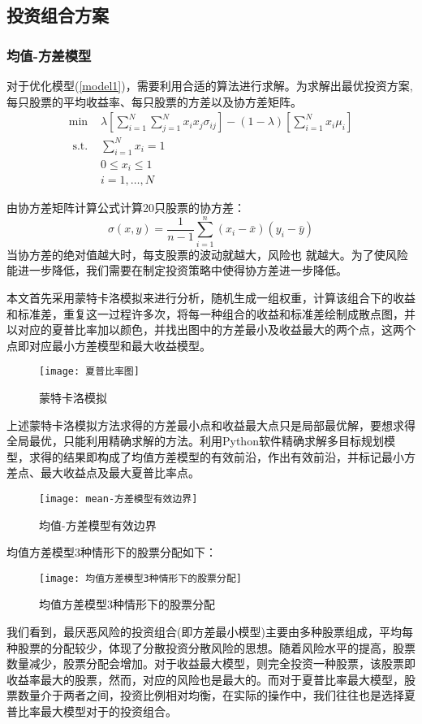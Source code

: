 \documentclass[withoutpreface,bwprint]{cumcmthesis} %
\begin{document}
	\subsection{投资组合方案}	
	\subsubsection{均值-方差模型}
	对于优化模型(\ref{model1})，需要利用合适的算法进行求解。为求解出最优投资方案,每只股票的平均收益率、每只股票的方差以及协方差矩阵。
	\begin{equation}
	\begin{array}{ll}
	\min & \lambda\left[\sum_{i=1}^{N} \sum_{j=1}^{N} x_{i} x_{j} \sigma_{i j}\right]-(1-\lambda)\left[\sum_{i=1}^{N} x_{i} \mu_{i}\right] \\
	\text { s.t. } & \sum_{i=1}^{N} x_{i}=1 \\
	& 0 \leq x_{i} \leq 1 \\
	& i=1, \ldots, N
	\end{array}
	\label{model1}
	\end{equation}

由协方差矩阵计算公式计算20只股票的协方差：
$$
\sigma(x, y)=\frac{1}{n-1} \sum_{i=1}^{n}\left(x_{i}-\bar{x}\right)\left(y_{i}-\bar{y}\right)
$$
当协方差的绝对值越大时，每支股票的波动就越大，风险也
就越大。为了使风险能进一步降低，我们需要在制定投资策略中使得协方差进一步降低。

本文首先采用蒙特卡洛模拟来进行分析，随机生成一组权重，计算该组合下的收益和标准差，重复这一过程许多次，将每一种组合的收益和标准差绘制成散点图，并以对应的夏普比率加以颜色，并找出图中的方差最小及收益最大的两个点，这两个点即对应最小方差模型和最大收益模型。
	\begin{figure}[H]
	\centering
	\texttt{[image: 夏普比率图]}
	\caption{蒙特卡洛模拟}
	\label{蒙特卡洛模拟}
\end{figure}
上述蒙特卡洛模拟方法求得的方差最小点和收益最大点只是局部最优解，要想求得全局最优，只能利用精确求解的方法。利用Python软件精确求解多目标规划模型，求得的结果即构成了均值方差模型的有效前沿，作出有效前沿，并标记最小方差点、最大收益点及最大夏普比率点。
	\begin{figure}[H]
	\centering
	\texttt{[image: mean-方差模型有效边界]}
	\caption{均值-方差模型有效边界}
	\label{mean-方差模型有效边界}
\end{figure}
均值方差模型3种情形下的股票分配如下：
	\begin{figure}[H]
	\centering
	\texttt{[image: 均值方差模型3种情形下的股票分配]}
	\caption{均值方差模型3种情形下的股票分配}
	\label{均值方差模型3种情形下的股票分配}
\end{figure}
我们看到，最厌恶风险的投资组合(即方差最小模型)主要由多种股票组成，平均每种股票的分配较少，体现了分散投资分散风险的思想。随着风险水平的提高，股票数量减少，股票分配会增加。对于收益最大模型，则完全投资一种股票，该股票即收益率最大的股票，然而，对应的风险也是最大的。而对于夏普比率最大模型，股票数量介于两者之间，投资比例相对均衡，在实际的操作中，我们往往也是选择夏普比率最大模型对于的投资组合。
\end{document}
